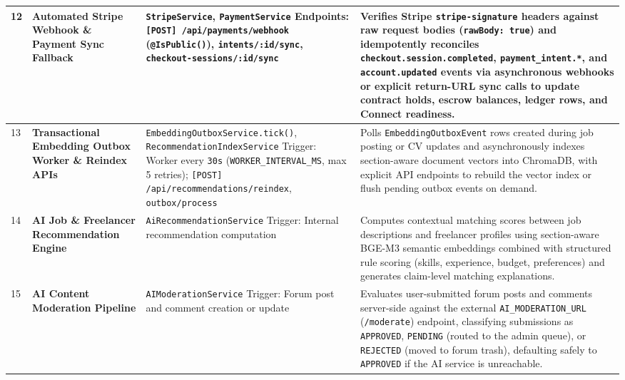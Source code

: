 \begin{longtable}{|C{0.7cm}|L{3.2cm}|S{5.4cm}|p{5.8cm}|}
12 &
\textbf{Automated Stripe Webhook \& Payment Sync Fallback} &
\texttt{StripeService}, \texttt{PaymentService} \newline
Endpoints: \texttt{[POST] /api/\allowbreak{}payments/\allowbreak{}webhook} (\texttt{@IsPublic()}), \texttt{intents/\allowbreak{}:id/\allowbreak{}sync}, \texttt{checkout-sessions/\allowbreak{}:id/\allowbreak{}sync} &
Verifies Stripe \texttt{stripe-signature} headers against raw request bodies (\texttt{rawBody: true}) and idempotently reconciles \texttt{checkout.session.completed}, \texttt{payment\_intent.*}, and \texttt{account.updated} events via asynchronous webhooks or explicit return-URL sync calls to update contract holds, escrow balances, ledger rows, and Connect readiness.
\\ \hline

13 &
\textbf{Transactional Embedding Outbox Worker \& Reindex APIs} &
\texttt{EmbeddingOutboxService.\allowbreak{}tick()}, \texttt{RecommendationIndexService} \newline
Trigger: Worker every \texttt{30s} (\texttt{WORKER\_INTERVAL\_MS}, max 5 retries); \texttt{[POST] /api/\allowbreak{}recommendations/\allowbreak{}reindex}, \texttt{outbox/\allowbreak{}process} &
Polls \texttt{EmbeddingOutboxEvent} rows created during job posting or CV updates and asynchronously indexes section-aware document vectors into ChromaDB, with explicit API endpoints to rebuild the vector index or flush pending outbox events on demand.
\\ \hline

14 &
\textbf{AI Job \& Freelancer Recommendation Engine} &
\texttt{AiRecommendationService} \newline
Trigger: Internal recommendation computation &
Computes contextual matching scores between job descriptions and freelancer profiles using section-aware BGE-M3 semantic embeddings combined with structured rule scoring (skills, experience, budget, preferences) and generates claim-level matching explanations.
\\ \hline

15 &
\textbf{AI Content Moderation Pipeline} &
\texttt{AIModerationService} \newline
Trigger: Forum post and comment creation or update &
Evaluates user-submitted forum posts and comments server-side against the external \texttt{AI\_MODERATION\_URL} (\texttt{/moderate}) endpoint, classifying submissions as \texttt{APPROVED}, \texttt{PENDING} (routed to the admin queue), or \texttt{REJECTED} (moved to forum trash), defaulting safely to \texttt{APPROVED} if the AI service is unreachable.
\\ \hline


\end{longtable}
